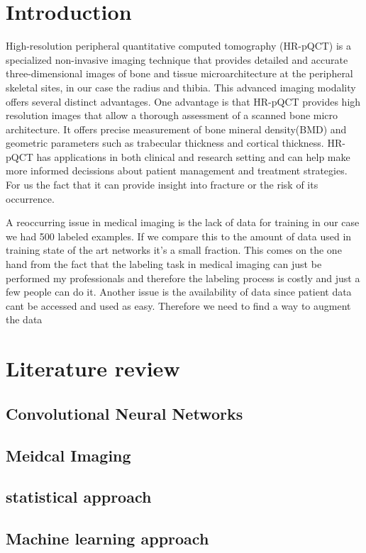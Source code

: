 \documentclass[acmsmall, review]{acmart}
\begin{document}
\section{Introduction}
	
	High-resolution peripheral quantitative computed tomography (HR-pQCT) is a specialized non-invasive imaging technique that provides detailed and accurate three-dimensional images of bone and tissue microarchitecture at the peripheral skeletal sites, in our case the radius and thibia. This advanced imaging modality offers several distinct advantages. One advantage is that HR-pQCT provides high resolution images that allow a thorough assessment of a scanned bone micro architecture. It offers precise measurement of bone mineral density(BMD) and geometric parameters such as trabecular thickness and cortical thickness. HR-pQCT has applications in both clinical and research setting and can help make more informed decissions about patient management and treatment strategies. For us the fact that it can provide insight into fracture or the risk of its occurrence.
	
	A reoccurring issue in medical imaging is the lack of data for training in our case we had 500 labeled examples. If we compare this to the amount of data used in training state of the art networks it's a small fraction. This comes on the one hand from the fact that the labeling task in medical imaging can just be performed my professionals and therefore the labeling process is costly and just a few people can do it. Another issue is the availability of data since patient data cant be accessed and used as easy. Therefore we need to find a way to augment the data 
\section{Literature review}
\subsection{Convolutional Neural Networks}
\subsection{Meidcal Imaging }
\subsection{statistical approach}
\subsection{Machine learning approach}
\end{document}
